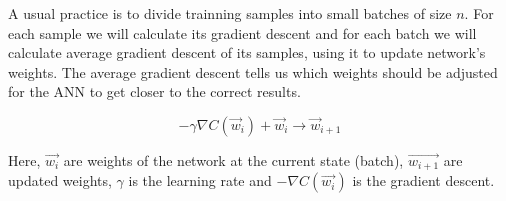 A usual practice is to divide trainning samples into small batches of size $n$. For each sample we will calculate its gradient descent and for each batch we will calculate average gradient descent of its samples, using it to update network's weights. The average gradient descent tells us which weights should be adjusted for the ANN to get closer to the correct results.\cite{birlliantbackprop}

\begin{equation}
    {- \gamma \nabla C(\vec{w}_i) + \vec{w}_i \rightarrow \vec{w}_{i+1} }
\end{equation}

Here, $\vec{w_i}$ are weights of the network at the current state (batch), $\vec{w_{i+1}}$ are updated weights, $\gamma$ is the learning rate and $-\nabla C(\vec{w_i})$ is the gradient descent.
